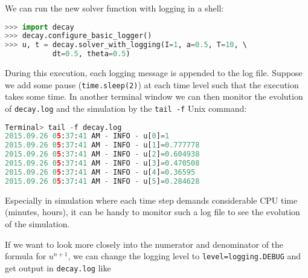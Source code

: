 \documentclass[graybox,sectrefs,envcountresetchap,open=right,final]{svmonodo}
\begin{document}
We can run the new solver function with logging in a shell:






\begin{lstlisting}[language=python,style=blue1_bluegreen]
>>> import decay
>>> decay.configure_basic_logger()
>>> u, t = decay.solver_with_logging(I=1, a=0.5, T=10, \ 
           dt=0.5, theta=0.5)

\end{lstlisting}

During this execution, each logging message is appended to the log file.
Suppose we add some pause (\texttt{time.sleep(2)}) at each time level such that
the execution takes some time. In another terminal window we can then
monitor the evolution of \texttt{decay.log} and the simulation
by the \texttt{tail -f} Unix command:









\begin{lstlisting}[language=python,style=blue1_bluegreen]
Terminal> tail -f decay.log
2015.09.26 05:37:41 AM - INFO - u[0]=1
2015.09.26 05:37:41 AM - INFO - u[1]=0.777778
2015.09.26 05:37:41 AM - INFO - u[2]=0.604938
2015.09.26 05:37:41 AM - INFO - u[3]=0.470508
2015.09.26 05:37:41 AM - INFO - u[4]=0.36595
2015.09.26 05:37:41 AM - INFO - u[5]=0.284628

\end{lstlisting}

Especially in simulation where each time step demands considerable
CPU time (minutes, hours), it can be handy to monitor such a log file
to see the evolution of the simulation.

If we want to look more closely into the numerator and denominator of
the formula for $u^{n+1}$, we can change the logging level to
\texttt{level=logging.DEBUG} and get output in \texttt{decay.log} like
\end{document}
